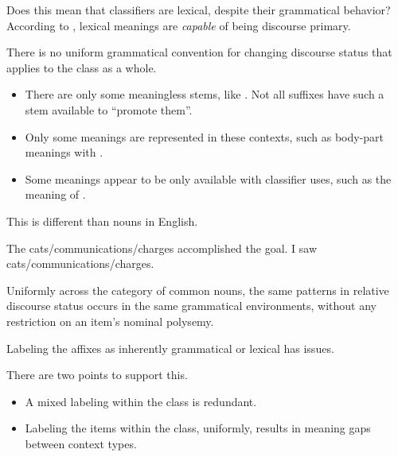 \documentclass{beamer}
\begin{document}
  

\begin{frame}{Does this mean that classifiers are lexical, despite their grammatical behavior?}
  According to \citet{Boye2012}, lexical meanings are \emph{capable} of being discourse primary.

  \vfill

  There is no uniform grammatical convention for changing discourse status that applies to the class as a whole.

  \begin{itemize}
  \item There are only some meaningless stems, like . Not all suffixes have such a stem available to ``promote them''.
  \item Only some meanings are represented in these contexts, such as body-part meanings with .
  \item Some meanings appear to be only available with classifier uses, such as the  meaning of .
  \end{itemize}
\end{frame}

\begin{frame}{This is different than nouns in English.}
  
  \pex
  \a The cats/communications/charges accomplished the goal.
  \a I saw cats/communications/charges.
  \xe

  Uniformly across the category of common nouns, the same patterns in relative discourse status occurs in the same grammatical environments, without any restriction on an item's nominal polysemy.

\end{frame}

\begin{frame}{Labeling the affixes as inherently grammatical or lexical has issues.}

  There are two points to support this.
  
  \begin{itemize}
  \item A mixed labeling within the class is redundant.
  \item Labeling the items within the class, uniformly, results in meaning gaps between context types.
  \end{itemize}
\end{frame}
\end{document}

